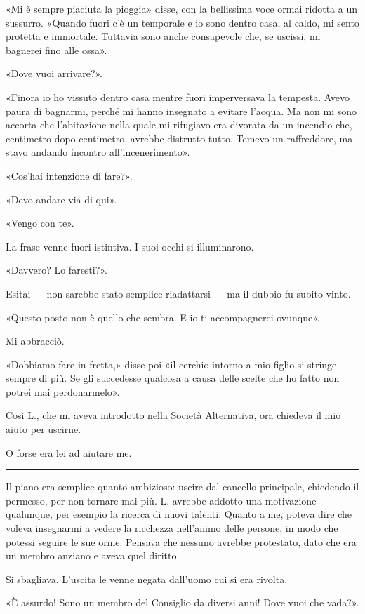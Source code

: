 \documentclass[a4paper,10pt]{memoir}
\begin{document}
«Mi è sempre piaciuta la pioggia» disse, con la bellissima voce ormai ridotta a un sussurro. «Quando fuori c'è un
temporale e io sono dentro casa, al caldo, mi sento protetta e immortale. Tuttavia sono anche consapevole che, se
uscissi, mi bagnerei fino alle ossa».

«Dove vuoi arrivare?».

«Finora io ho vissuto dentro casa mentre fuori imperversava la tempesta. Avevo paura di bagnarmi, perché mi hanno
insegnato a evitare l'acqua. Ma non mi sono accorta che l'abitazione nella quale mi rifugiavo era divorata da un
incendio che, centimetro dopo centimetro, avrebbe distrutto tutto. Temevo un raffreddore, ma stavo andando incontro
all'incenerimento».

«Cos'hai intenzione di fare?».

«Devo andare via di qui».

«Vengo con te».

La frase venne fuori istintiva. I suoi occhi si illuminarono.

«Davvero? Lo faresti?».

Esitai --- non sarebbe stato semplice riadattarsi --- ma il dubbio fu subito vinto.

«Questo posto non è quello che sembra. E io ti accompagnerei ovunque».

Mi abbracciò.

«Dobbiamo fare in fretta,» disse poi «il cerchio intorno a mio figlio si stringe sempre di più. Se gli succedesse
qualcosa a causa delle scelte che ho fatto non potrei mai perdonarmelo».

Così L., che mi aveva introdotto nella Società Alternativa, ora chiedeva il mio aiuto per uscirne.

O forse era lei ad aiutare me.

\plainbreak{1}

Il piano era semplice quanto ambizioso: uscire dal cancello principale, chiedendo il permesso, per non tornare mai più.
L. avrebbe addotto una motivazione qualunque, per esempio la ricerca di nuovi talenti. Quanto a me, poteva dire che
voleva insegnarmi a vedere la ricchezza nell'animo delle persone, in modo che potessi seguire le sue orme. Pensava che
nessuno avrebbe protestato, dato che era un membro anziano e aveva quel diritto.

Si sbagliava. L'uscita le venne negata dall'uomo cui si era rivolta.

«È assurdo! Sono un membro del Consiglio da diversi anni! Dove vuoi che vada?».
\end{document}

